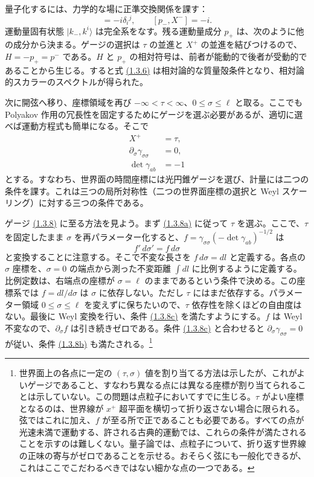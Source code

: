 量子化するには、力学的な場に正準交換関係を課す：
\begin{equation}
[p_i,X^j]=-i\delta_i{}^j,\qquad [p_-,X^-]=-i.
\tag{1.3.7}\label{eq:1.3.7}
\end{equation}
運動量固有状態 $\lvert k_-,k^i\rangle$ は完全系をなす。残る運動量成分 $p_+$ は、次のように他の成分から決まる。ゲージの選択は $\tau$ の並進と $X^+$ の並進を結びつけるので、$H=-p_+=p^-$ である。$H$ と $p_+$ の相対符号は、前者が能動的で後者が受動的であることから生じる。すると式 \hyperref[eq:1.3.6]{(1.3.6)} は相対論的な質量殻条件となり、相対論的スカラーのスペクトルが得られた。

次に開弦へ移り、座標領域を再び $-\infty<\tau<\infty$、$0\leq\sigma\leq\ell$ と取る。ここでも Polyakov 作用の冗長性を固定するためにゲージを選ぶ必要があるが、適切に選べば運動方程式も簡単になる。そこで
\begin{align}
X^+&=\tau,
\tag{1.3.8a}\label{eq:1.3.8a}\\
\partial_\sigma\gamma_{\sigma\sigma}&=0,
\tag{1.3.8b}\label{eq:1.3.8b}\\
\det\gamma_{ab}&=-1
\tag{1.3.8c}\label{eq:1.3.8c}
\end{align}
とする。すなわち、世界面の時間座標には光円錐ゲージを選び、計量には二つの条件を課す。これは三つの局所対称性（二つの世界面座標の選択と Weyl スケーリング）に対する三つの条件である。

ゲージ \hyperref[eq:1.3.8a]{(1.3.8)} に至る方法を見よう。まず \hyperref[eq:1.3.8a]{(1.3.8a)} に従って $\tau$ を選ぶ。ここで、$\tau$ を固定したまま $\sigma$ を再パラメーター化すると、$f=\gamma_{\sigma\sigma}(-\det\gamma_{ab})^{-1/2}$ は
\begin{equation}
f'\,d\sigma'=f\,d\sigma
\tag{1.3.9}\label{eq:1.3.9}
\end{equation}
と変換することに注意する。そこで不変な長さを $f\,d\sigma=dl$ と定義する。各点の $\sigma$ 座標を、$\sigma=0$ の端点から測った不変距離 $\int dl$ に比例するように定義する。比例定数は、右端点の座標が $\sigma=\ell$ のままであるという条件で決める。この座標系では $f=dl/d\sigma$ は $\sigma$ に依存しない。ただし $\tau$ にはまだ依存する。パラメーター領域 $0\leq\sigma\leq\ell$ を変えずに保ちたいので、$\tau$ 依存性を除くほどの自由度はない。最後に Weyl 変換を行い、条件 \hyperref[eq:1.3.8c]{(1.3.8c)} を満たすようにする。$f$ は Weyl 不変なので、$\partial_\sigma f$ は引き続きゼロである。条件 \hyperref[eq:1.3.8c]{(1.3.8c)} と合わせると $\partial_\sigma\gamma_{\sigma\sigma}=0$ が従い、条件 \hyperref[eq:1.3.8b]{(1.3.8b)} も満たされる。\footnote[4]{世界面上の各点に一定の $(\tau,\sigma)$ 値を割り当てる方法は示したが、これがよいゲージであること、すなわち異なる点には異なる座標が割り当てられることは示していない。この問題は点粒子においてすでに生じる。$\tau$ がよい座標となるのは、世界線が $x^+$ 超平面を横切って折り返さない場合に限られる。弦ではこれに加え、$f$ が至る所で正であることも必要である。すべての点が光速未満で運動する、許される古典的運動では、これらの条件が満たされることを示すのは難しくない。量子論では、点粒子について、折り返す世界線の正味の寄与がゼロであることを示せる。おそらく弦にも一般化できるが、これはここでこだわるべきではない細かな点の一つである。}

